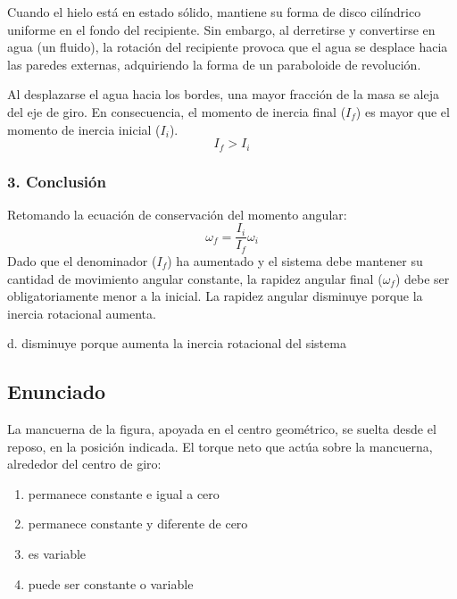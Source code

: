 \documentclass[12pt, a4paper]{article}
\begin{document}
Cuando el hielo está en estado sólido, mantiene su forma de disco cilíndrico uniforme en el fondo del recipiente. Sin embargo, al derretirse y convertirse en agua (un fluido), la rotación del recipiente provoca que el agua se desplace hacia las paredes externas, adquiriendo la forma de un paraboloide de revolución. 

Al desplazarse el agua hacia los bordes, una mayor fracción de la masa se aleja del eje de giro. En consecuencia, el momento de inercia final ($I_f$) es mayor que el momento de inercia inicial ($I_i$).
$$I_f > I_i$$

\subsubsection*{3. Conclusión}
Retomando la ecuación de conservación del momento angular:
$$\omega_f = \frac{I_i}{I_f} \omega_i$$
Dado que el denominador ($I_f$) ha aumentado y el sistema debe mantener su cantidad de movimiento angular constante, la rapidez angular final ($\omega_f$) debe ser obligatoriamente menor a la inicial. La rapidez angular disminuye porque la inercia rotacional aumenta.

\begin{tcolorbox}[colback=green!5!white, colframe=green!50!black, title=Respuesta Correcta]
\centering \Large d. disminuye porque aumenta la inercia rotacional del sistema
\end{tcolorbox}

\newpage

\subsection*{Enunciado}
La mancuerna de la figura, apoyada en el centro geométrico, se suelta desde el reposo, en la posición indicada. El torque neto que actúa sobre la mancuerna, alrededor del centro de giro:
\begin{enumerate}[label=\alph*.]
    \item permanece constante e igual a cero
    \item permanece constante y diferente de cero
    \item es variable
    \item puede ser constante o variable
\end{enumerate}

\begin{center}
\end{center}
\end{document}
